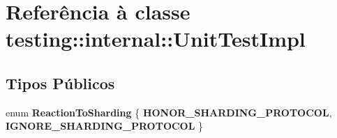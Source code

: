 \hypertarget{classtesting_1_1internal_1_1UnitTestImpl}{\section{Referência à classe testing\-:\-:internal\-:\-:Unit\-Test\-Impl}
\label{classtesting_1_1internal_1_1UnitTestImpl}
}
\subsection*{Tipos Públicos}
\begin{DoxyCompactItemize}
\item 
enum {\bfseries Reaction\-To\-Sharding} \{ {\bfseries H\-O\-N\-O\-R\-\_\-\-S\-H\-A\-R\-D\-I\-N\-G\-\_\-\-P\-R\-O\-T\-O\-C\-O\-L}, 
{\bfseries I\-G\-N\-O\-R\-E\-\_\-\-S\-H\-A\-R\-D\-I\-N\-G\-\_\-\-P\-R\-O\-T\-O\-C\-O\-L}
 \}
\end{DoxyCompactItemize}
